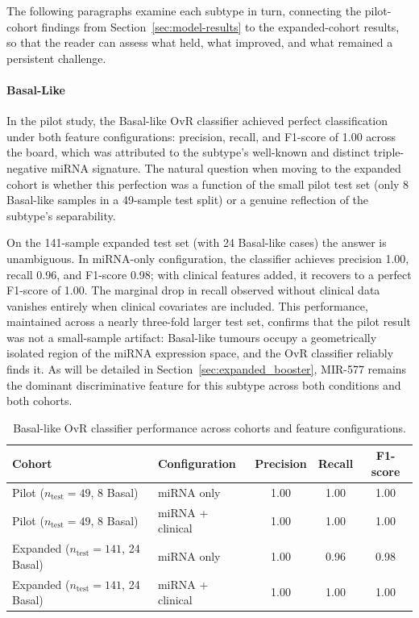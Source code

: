 The following paragraphs examine each subtype in turn, connecting the pilot-cohort
findings from Section~\ref{sec:model-results} to the expanded-cohort results, so
that the reader can assess what held, what improved, and what remained a persistent
challenge.

\paragraph{Basal-Like}

In the pilot study, the Basal-like OvR classifier achieved perfect classification
under both feature configurations: precision, recall, and F1-score of 1.00 across
the board, which was attributed to the subtype's well-known and distinct triple-negative
miRNA signature. The natural question when moving to the expanded cohort is whether
this perfection was a function of the small pilot test set (only 8 Basal-like samples
in a 49-sample test split) or a genuine reflection of the subtype's separability.

On the 141-sample expanded test set (with 24 Basal-like cases) the answer is
unambiguous. In miRNA-only configuration, the classifier achieves precision 1.00,
recall 0.96, and F1-score 0.98; with clinical features added, it recovers to a
perfect F1-score of 1.00. The marginal drop in recall observed without clinical
data vanishes entirely when clinical
covariates are included. This performance, maintained across a nearly three-fold
larger test set, confirms that the pilot result was not a small-sample artifact:
Basal-like tumours occupy a geometrically isolated region of the miRNA expression
space, and the OvR classifier reliably finds it. As will be detailed in
Section~\ref{sec:expanded_booster}, MIR-577 remains the dominant discriminative
feature for this subtype across both conditions and both cohorts.

\begin{table}[!ht]
    \centering
    \caption{Basal-like OvR classifier performance across cohorts and feature configurations.}
    \label{tab:basal_expanded}
    \begin{tabular}{llccc}
    \toprule
    \textbf{Cohort} & \textbf{Configuration} & \textbf{Precision} & \textbf{Recall} & \textbf{F1-score} \\
    \midrule
    Pilot ($n_{\text{test}}=49$, 8 Basal)   & miRNA only         & 1.00 & 1.00 & 1.00 \\
    Pilot ($n_{\text{test}}=49$, 8 Basal)   & miRNA + clinical   & 1.00 & 1.00 & 1.00 \\
    \midrule
    Expanded ($n_{\text{test}}=141$, 24 Basal) & miRNA only      & 1.00 & 0.96 & 0.98 \\
    Expanded ($n_{\text{test}}=141$, 24 Basal) & miRNA + clinical & 1.00 & 1.00 & 1.00 \\
    \bottomrule
    \end{tabular}
\end{table}

